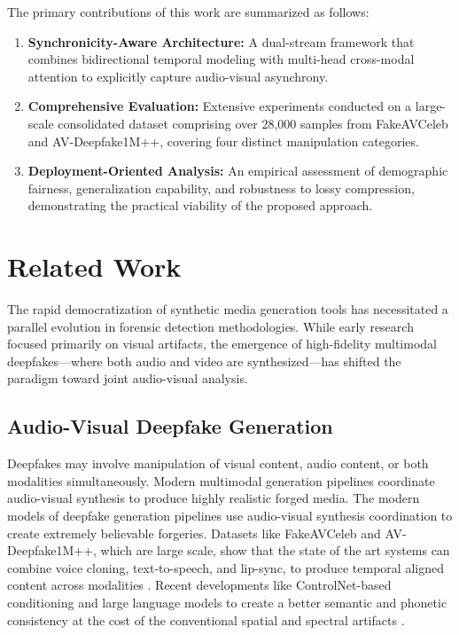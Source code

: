 \documentclass[conference]{IEEEtran}
\begin{document}
The primary contributions of this work are summarized as follows:
\begin{enumerate}
    \item \textbf{Synchronicity-Aware Architecture:} A dual-stream framework that combines bidirectional temporal modeling with multi-head cross-modal attention to explicitly capture audio-visual asynchrony.
    \item \textbf{Comprehensive Evaluation:} Extensive experiments conducted on a large-scale consolidated dataset comprising over 28,000 samples from FakeAVCeleb and AV-Deepfake1M++, covering four distinct manipulation categories.
    \item \textbf{Deployment-Oriented Analysis:} An empirical assessment of demographic fairness, generalization capability, and robustness to lossy compression, demonstrating the practical viability of the proposed approach.
\end{enumerate}


\section{Related Work}
The rapid democratization of synthetic media generation tools has necessitated a parallel evolution in forensic detection methodologies. While early research focused primarily on visual artifacts, the emergence of high-fidelity multimodal deepfakes—where both audio and video are synthesized—has shifted the paradigm toward joint audio-visual analysis.

\subsection{Audio-Visual Deepfake Generation}
Deepfakes may involve manipulation of visual content, audio content, or both modalities simultaneously. Modern multimodal generation pipelines coordinate audio-visual synthesis to produce highly realistic forged media.
The modern models of deepfake generation pipelines use audio-visual synthesis coordination to create extremely believable forgeries. Datasets like FakeAVCeleb and AV-Deepfake1M++, which are large scale, show that the state of the art systems can combine voice cloning, text-to-speech, and lip-sync, to produce temporal aligned content across modalities \cite{Khalid2022,Jung2024}. Recent developments like ControlNet-based conditioning and large language models to create a better semantic and phonetic consistency at the cost of the conventional spatial and spectral artifacts \cite{Zhang2023ControlNet}.
\end{document}
